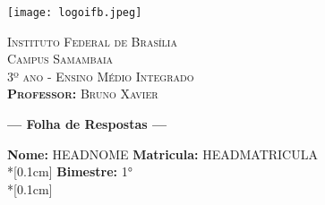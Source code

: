 \documentclass[11pt,a4paper]{article}
\begin{document}
\frenchspacing
\begin{center}
    \begin{minipage}{4cm}
		\begin{center}
			\texttt{[image: logoifb.jpeg]}
		\end{center}
	\end{minipage}
	\begin{minipage}{11.4cm}
		\begin{center}
				{\small \textsc{Instituto Federal de Brasília}			\\
						  \textsc{Campus Samambaia}\\
						  \textsc{3º ano - Ensino Médio Integrado} \\
                          \textsc{\textbf{Professor:} Bruno Xavier}\\
                }
		\end{center}
	\end{minipage}
\end{center}


{\sf
  \begin{center}
    \Large \textbf{--- Folha de Respostas ---}%
  \end{center}
}\bigskip

\setlength{\marginparwidth}{5cm}
\small \noindent \textbf{Nome:}\hspace{0.3cm} HEADNOME
\hrulefill \hspace{0.1cm}
\textbf{Matricula:}\hspace{0.1cm} HEADMATRICULA \\*[0.1cm]
\textbf{Bimestre:}\hspace{0.1cm} 1° \\*[0.1cm]
\end{document}
